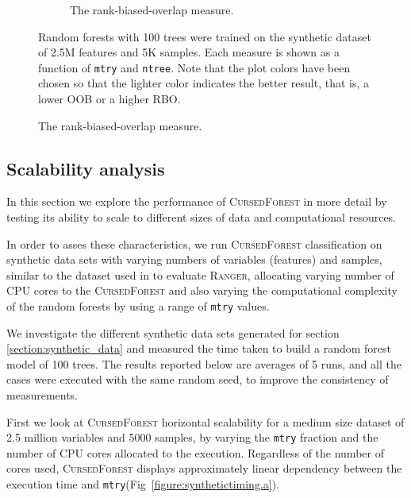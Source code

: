 \documentclass[10pt,letterpaper]{article}
\newcommand{\cursedforest}{\textsc{CursedForest}\xspace}
\newcommand{\ranger}{\textsc{Ranger}\xspace}
\newcommand{\mtry}{\texttt{mtry}\xspace}
\newcommand{\ntree}{\texttt{ntree}\xspace}
\begin{document}
\begin{figure}[tbhp]
\begin{adjustwidth}{-1.00in}{0in}
\begin{subfigure}[b]{0.5\linewidth}
      \caption{The rank-biased-overlap measure.} 
      \label{figure:rbo-prod.png} 
    \end{subfigure} 
    \begin{flushleft} 
      Random forests with 100 trees were trained on the synthetic dataset of 2.5M features and 5K samples.
      Each measure is shown as a function of \mtry and \ntree. Note that the plot colors have been chosen so that the lighter color indicates
      the better result, that is, a lower OOB or a higher RBO.
    \end{flushleft}
  \end{adjustwidth}
\end{figure}



\subsection{Scalability analysis}
In this section we explore the performance of \cursedforest in more detail by testing its ability to scale to different sizes of data
and computational resources.

In order to asses these characteristics, we run \cursedforest classification on synthetic data sets with varying numbers
of variables (features) and samples, similar to the dataset used in \cite{Wright.and.Ziegle.2016} to evaluate
\ranger, allocating varying number of CPU cores to the \cursedforest and also varying the computational complexity
of the random forests by using a range of \mtry values.

We investigate the different synthetic data sets generated for section \ref{section:synthetic_data} and measured the time
taken to build a random forest model of 100 trees. The results reported below are averages of 5 runs, and all the cases
were executed with the same random seed, to improve the consistency of measurements.

First we look at \cursedforest horizontal scalability for a medium size dataset of 2.5 million variables and 5000
samples, by varying the \mtry  fraction and the number of CPU cores allocated to the execution. 
Regardless of the number of cores used, \cursedforest displays approximately linear dependency between the execution
time and \mtry (Fig~\ref{figure:synthetictiming.a}).
\end{document}
